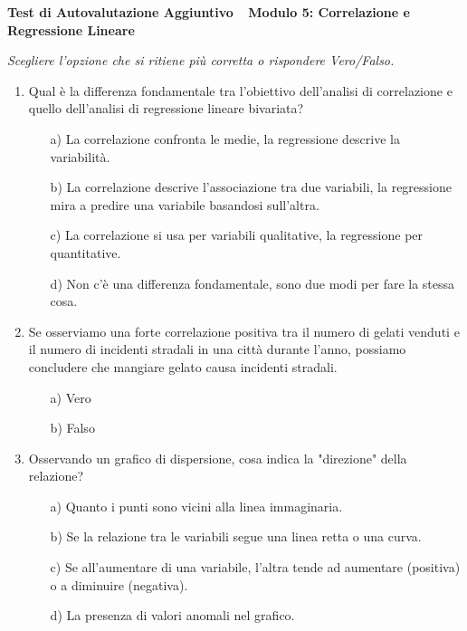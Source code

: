 \documentclass[12pt, a4paper]{article}
\begin{document}
\begin{center}
\Large\textbf{Test di Autovalutazione Aggiuntivo} \
\vspace{0.2cm}
\large\textbf{Modulo 5: Correlazione e Regressione Lineare}
\end{center}
\vspace{0.5cm}

\textit{Scegliere l'opzione che si ritiene più corretta o rispondere Vero/Falso.}

\begin{enumerate}


\item Qual è la differenza fondamentale tra l'obiettivo dell'analisi di correlazione e quello dell'analisi di regressione lineare bivariata?
\begin{itemize}
    \item[a)] La correlazione confronta le medie, la regressione descrive la variabilità.
    \item[b)] La correlazione descrive l'associazione tra due variabili, la regressione mira a predire una variabile basandosi sull'altra.
    \item[c)] La correlazione si usa per variabili qualitative, la regressione per quantitative.
    \item[d)] Non c'è una differenza fondamentale, sono due modi per fare la stessa cosa.
\end{itemize}
\vspace{0.3cm}

\item Se osserviamo una forte correlazione positiva tra il numero di gelati venduti e il numero di incidenti stradali in una città durante l'anno, possiamo concludere che mangiare gelato causa incidenti stradali.
\begin{itemize}
    \item[a)] Vero
    \item[b)] Falso
\end{itemize}
\vspace{0.3cm}

\item  Osservando un grafico di dispersione, cosa indica la "direzione" della relazione?
\begin{itemize}
    \item[a)] Quanto i punti sono vicini alla linea immaginaria.
    \item[b)] Se la relazione tra le variabili segue una linea retta o una curva.
    \item[c)] Se all'aumentare di una variabile, l'altra tende ad aumentare (positiva) o a diminuire (negativa).
    \item[d)] La presenza di valori anomali nel grafico.
\end{itemize}
\vspace{0.3cm}


\end{enumerate}
\end{document}
